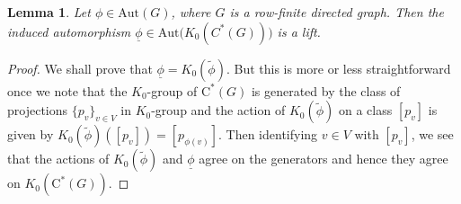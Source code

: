 \documentclass[a4paper,11pt,reqno]{amsart}
\theoremstyle{plain}
\newtheorem{lem}[thm]{Lemma}
\theoremstyle{named}
\numberwithin{equation}{section}
\begin{document}
            \begin{lem}
            \label{lift}
                Let $\phi\in\textrm {Aut}(G)$, where $G$ is a row-finite directed graph. Then the induced automorphism $\underline{\phi}\in\textrm {Aut}\Big(K_{0}(C^{\ast}(G))\Big)$ is a lift.
            \end{lem}
            \begin{proof}
             We shall prove that $\underline{\phi}=K_{0}(\widetilde{\phi})$. But this is more or less straightforward once we note that the $K_{0}$-group of $\textrm{C}^{\ast}(G)$ is generated by the class of projections $\{p_{v}\}_{v\in V}$ in $K_{0}$-group and the action of $K_{0}(\widetilde{\phi})$ on a class $[p_{v}]$ is given by $K_{0}(\widetilde{\phi})([p_{v}])=[p_{\phi(v)}]$. Then identifying $v\in V$ with $[p_{v}]$, we see that the actions of $K_{0}(\widetilde{\phi})$ and $\underline{\phi}$ agree on the generators and hence they agree on $K_{0}(\textrm{C}^{\ast}(G))$.    
            \end{proof}
\end{document}
